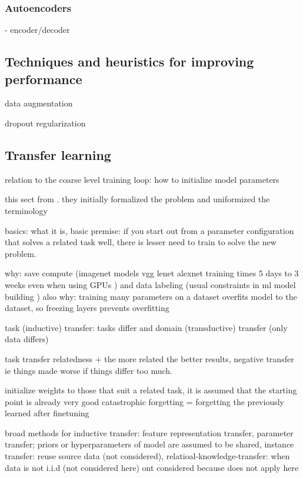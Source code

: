 \documentclass{article}
\begin{document}
\subsubsection{Autoencoders}

- encoder/decoder

\subsection{Techniques and heuristics for improving performance}

data augmentation

dropout regularization

\subsection{Transfer learning}

relation to the coarse level training loop: how to initialize model parameters

this sect from \cite{transferlearning_survey}. they initially formalized the problem and uniformized 
the terminology

basics: what it is, basic premise: if you start out from a parameter configuration that solves a related 
task well, there is lesser need to train to solve the new problem.

why: save compute (imagenet models vgg lenet alexnet training times 5 days to 3 weeks even when using GPUs \cite{vgg}) and data labeling (usual constraints in ml model building \cite{engbook})
also why: training many parameters on a dataset overfits model to the dataset, so freezing layers prevents overfitting \cite{googlelenet}

task (inductive) transfer: tasks differ and domain (transductive) transfer (only data differs)

task transfer relatedness + the more related the better results, negative transfer ie things made worse if 
things differ too much.

initialize weights to those that suit a related task, it is assumed that the starting point is already very good
catastrophic forgetting = forgetting the previously learned after finetuning

broad methods for inductive transfer: feature representation transfer, parameter transfer; priors or hyperparameters of model are assumed to be shared,
instance transfer: reuse source data (not considered), relatioal-knowledge-transfer: when data is not i.i.d (not considered here)
ont considered because does not apply here
\end{document}
